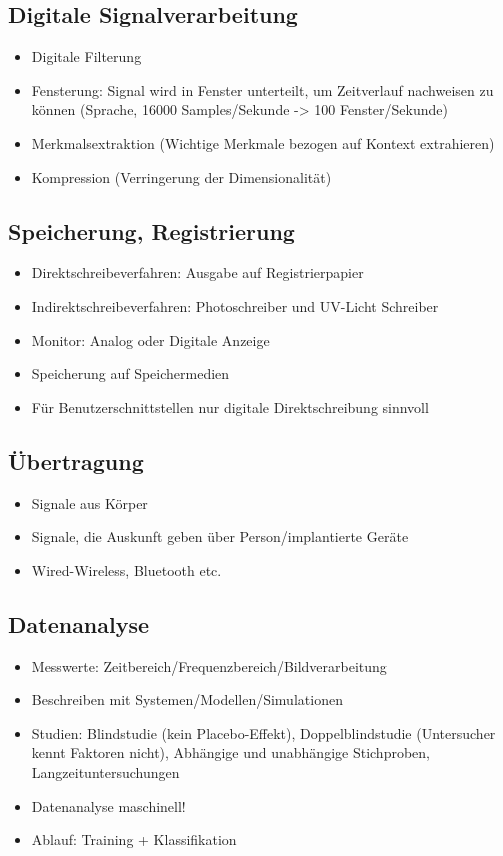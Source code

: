 \documentclass[a4paper,10pt,oneside]{article}
\begin{document}
\subsection{Digitale Signalverarbeitung}
\begin{itemize}
	\item Digitale Filterung
	\item Fensterung: Signal wird in Fenster unterteilt, um Zeitverlauf nachweisen zu können (Sprache, 16000 Samples/Sekunde -> 100 Fenster/Sekunde)
	\item Merkmalsextraktion (Wichtige Merkmale bezogen auf Kontext extrahieren)
	\item Kompression (Verringerung der Dimensionalität)
\end{itemize}

\subsection{Speicherung, Registrierung}
\begin{itemize}
	\item Direktschreibeverfahren: Ausgabe auf Registrierpapier
	\item Indirektschreibeverfahren: Photoschreiber und UV-Licht Schreiber
	\item Monitor: Analog oder Digitale Anzeige
	\item Speicherung auf Speichermedien
	\item Für Benutzerschnittstellen nur digitale Direktschreibung sinnvoll
\end{itemize}

\subsection{Übertragung}
\begin{itemize}
	\item Signale aus Körper
	\item Signale, die Auskunft geben über Person/implantierte Geräte
	\item Wired-Wireless, Bluetooth etc.
\end{itemize}

\subsection{Datenanalyse}
\begin{itemize}
	\item Messwerte: Zeitbereich/Frequenzbereich/Bildverarbeitung
	\item Beschreiben mit Systemen/Modellen/Simulationen
	\item Studien: Blindstudie (kein Placebo-Effekt), Doppelblindstudie (Untersucher kennt Faktoren nicht), Abhängige und unabhängige Stichproben, Langzeituntersuchungen
	\item Datenanalyse maschinell!
	\item Ablauf: Training + Klassifikation
\end{itemize}
\end{document}
